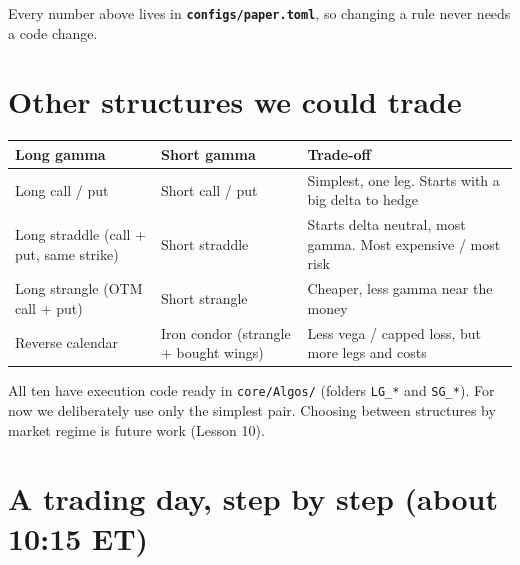 \documentclass{article}
\begin{document}
Every number above lives in \textbf{\texttt{configs/\allowbreak{}paper.\allowbreak{}toml}}, so changing a rule never needs a code change.

\section{Other structures we could trade}

\begin{center}\small
\begin{tabularx}{\linewidth}{>{\raggedright\arraybackslash}X >{\raggedright\arraybackslash}X >{\raggedright\arraybackslash}X}
\toprule
\textbf{Long gamma} & \textbf{Short gamma} & \textbf{Trade-off} \\
\midrule
Long call /\allowbreak{} put & Short call /\allowbreak{} put & Simplest, one leg. Starts with a big delta to hedge \\
Long straddle (call + put, same strike) & Short straddle & Starts delta neutral, most gamma. Most expensive /\allowbreak{} most risk \\
Long strangle (OTM call + put) & Short strangle & Cheaper, less gamma near the money \\
Reverse calendar & Iron condor (strangle + bought wings) & Less vega /\allowbreak{} capped loss, but more legs and costs \\
\bottomrule
\end{tabularx}
\end{center}

All ten have execution code ready in \texttt{core/\allowbreak{}Algos/\allowbreak{}} (folders \texttt{LG\_\allowbreak{}*} and \texttt{SG\_\allowbreak{}*}). For now we deliberately use only the simplest pair. Choosing between structures by market regime is future work (Lesson 10).

\section{A trading day, step by step (about 10:15 ET)}
\end{document}
